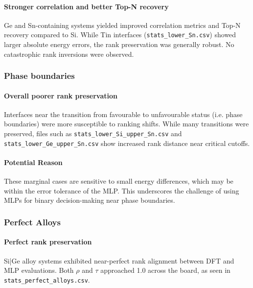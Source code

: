 \paragraph{Stronger correlation and better Top-N recovery}

Ge and Sn-containing systems yielded improved correlation metrics and Top-N recovery compared to Si. While Tin interfaces (\texttt{stats\_lower\_Sn.csv}) showed larger absolute energy errors, the rank preservation was generally robust. No catastrophic rank inversions were observed.

\subsubsection{Phase boundaries}

\paragraph{Overall poorer rank preservation}

Interfaces near the transition from favourable to unfavourable status (i.e. phase boundaries) were more susceptible to ranking shifts. While many transitions were preserved, files such as \texttt{stats\_lower\_Si\_upper\_Sn.csv} and \texttt{stats\_lower\_Ge\_upper\_Sn.csv} show increased rank distance near critical cutoffs.

\paragraph{Potential Reason}

These marginal cases are sensitive to small energy differences, which may be within the error tolerance of the MLP. This underscores the challenge of using MLPs for binary decision-making near phase boundaries.

\subsubsection{Perfect Alloys}

\paragraph{Perfect rank preservation}

Si|Ge alloy systems exhibited near-perfect rank alignment between DFT and MLP evaluations. Both $\rho$ and $\tau$ approached 1.0 across the board, as seen in \texttt{stats\_perfect\_alloys.csv}.


